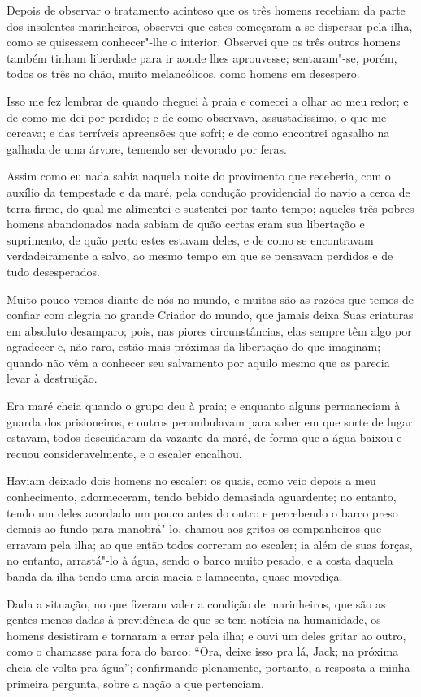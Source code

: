Depois de observar o tratamento acintoso que os três homens recebiam da
parte dos insolentes marinheiros, observei que estes começaram a se
dispersar pela ilha, como se quisessem conhecer"-lhe o interior. Observei
que os três outros homens também tinham liberdade para ir aonde lhes
aprouvesse; sentaram"-se, porém, todos os três no chão, muito
melancólicos, como homens em desespero.

Isso me fez lembrar de quando cheguei à praia e comecei a olhar ao meu
redor; e de como me dei por perdido; e de como observava,
assustadíssimo, o que me cercava; e das terríveis apreensões que sofri;
e de como encontrei agasalho na galhada de uma árvore, temendo ser
devorado por feras.

Assim como eu nada sabia naquela noite do provimento que receberia, com
o auxílio da tempestade e da maré, pela condução providencial do navio a
cerca de terra firme, do qual me alimentei e sustentei por tanto tempo;
aqueles três pobres homens abandonados nada sabiam de quão certas eram
sua libertação e suprimento, de quão perto estes estavam deles, e de
como se encontravam verdadeiramente a salvo, ao mesmo tempo em que se
pensavam perdidos e de tudo desesperados.

Muito pouco vemos diante de nós no mundo, e muitas são as razões que
temos de confiar com alegria no grande Criador do mundo, que jamais
deixa Suas criaturas em absoluto desamparo; pois, nas piores
circunstâncias, elas sempre têm algo por agradecer e, não raro, estão
mais próximas da libertação do que imaginam; quando não vêm a conhecer
seu salvamento por aquilo mesmo que as parecia levar à destruição.

Era maré cheia quando o grupo deu à praia; e enquanto alguns permaneciam
à guarda dos prisioneiros, e outros perambulavam para saber em que sorte
de lugar estavam, todos descuidaram da vazante da maré, de forma que a
água baixou e recuou consideravelmente, e o escaler encalhou.

Haviam deixado dois homens no escaler; os quais, como veio depois a meu
conhecimento, adormeceram, tendo bebido demasiada aguardente; no
entanto, tendo um deles acordado um pouco antes do outro e percebendo o
barco preso demais ao fundo para manobrá"-lo, chamou aos gritos os
companheiros que erravam pela ilha; ao que então todos correram ao
escaler; ia além de suas forças, no entanto, arrastá"-lo à água, sendo o
barco muito pesado, e a costa daquela banda da ilha tendo uma areia
macia e lamacenta, quase movediça.

Dada a situação, no que fizeram valer a condição de marinheiros, que são
as gentes menos dadas à previdência de que se tem notícia na humanidade,
os homens desistiram e tornaram a errar pela ilha; e ouvi um deles
gritar ao outro, como o chamasse para fora do barco: ``Ora, deixe isso
pra lá, Jack; na próxima cheia ele volta pra água''; confirmando
plenamente, portanto, a resposta a minha primeira pergunta, sobre a
nação a que pertenciam.

